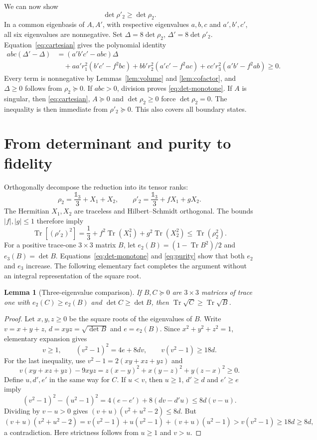 \documentclass[11pt,a4paper]{article}
\DeclareMathOperator{\Tr}{Tr}
\newcommand{\id}{\mathds{1}}
\newtheorem{lemma}{Lemma}
\begin{document}
We can now show
\begin{equation}\label{eq:det-monotone}
 \det\rho'_2\ge\det\rho_2.
\end{equation}
In a common eigenbasis of $A,A'$, with respective eigenvalues $a,b,c$
and $a',b',c'$, all six eigenvalues are nonnegative. Set
$\Delta=8\det\rho_2$, $\Delta'=8\det\rho'_2$.
Equation~\eqref{eq:cartesian} gives the polynomial identity
\begin{align*}
 abc(\Delta'-\Delta)
 &=(a'b'c'-abc)\Delta\\
 &\quad+aa'r_1^2(b'c'-f^2bc)
       +bb'r_2^2(a'c'-f^2ac)
       +cc'r_3^2(a'b'-f^2ab)\ge0.
\end{align*}
Every term is nonnegative by Lemmas~\ref{lem:volume} and
\ref{lem:cofactor}, and $\Delta\ge0$ follows from $\rho_2\succeq0$.
If $abc>0$, division proves \eqref{eq:det-monotone}.
If $A$ is singular, then
\eqref{eq:cartesian}, $A\succeq0$ and $\det\rho_2\ge0$ force
$\det\rho_2=0$. The inequality is then immediate from
$\rho'_2\succeq0$. This also covers all boundary states.

\section{From determinant and purity to fidelity}
Orthogonally decompose the reduction into its tensor ranks:
\[
 \rho_2=\frac{\id_3}{3}+X_1+X_2,\qquad
 \rho'_2=\frac{\id_3}{3}+fX_1+gX_2.
\]
The Hermitian $X_1,X_2$ are traceless and Hilbert--Schmidt orthogonal.
The bounds $|f|,|g|\le1$ therefore imply
\begin{equation}\label{eq:purity}
 \Tr[(\rho'_2)^2]=\frac13+f^2\Tr(X_1^2)+g^2\Tr(X_2^2)
 \le\Tr(\rho_2^2).
\end{equation}
For a positive trace-one $3\times3$ matrix $B$, let
$e_2(B)=(1-\Tr B^2)/2$ and $e_3(B)=\det B$.
Equations~\eqref{eq:det-monotone} and \eqref{eq:purity} show that
both $e_2$ and $e_3$ increase. The following elementary fact completes
the argument without an integral representation of the square root.

\begin{lemma}[Three-eigenvalue comparison]\label{lem:roots}
If $B,C\succeq0$ are $3\times3$ matrices of trace one with
$e_2(C)\ge e_2(B)$ and $\det C\ge\det B$, then
$\Tr\sqrt C\ge\Tr\sqrt B$.
\end{lemma}
\begin{proof}
Let $x,y,z\ge0$ be the square roots of the eigenvalues of $B$.
Write $v=x+y+z$, $d=xyz=\sqrt{\det B}$ and $e=e_2(B)$.
Since $x^2+y^2+z^2=1$, elementary expansion gives
\begin{equation}\label{eq:root-identities}
 v\ge1,\qquad (v^2-1)^2=4e+8dv,\qquad v(v^2-1)\ge18d.
\end{equation}
For the last inequality, use $v^2-1=2(xy+xz+yz)$ and
\[
 v(xy+xz+yz)-9xyz
 =z(x-y)^2+x(y-z)^2+y(z-x)^2\ge0.
\]
Define $u,d',e'$ in the same way for $C$. If $u<v$, then
$u\ge1$, $d'\ge d$ and $e'\ge e$ imply
\[
 (v^2-1)^2-(u^2-1)^2
 =4(e-e')+8(dv-d'u)\le8d(v-u).
\]
Dividing by $v-u>0$ gives
$(v+u)(v^2+u^2-2)\le8d$. But
\[
 (v+u)(v^2+u^2-2)
 =v(v^2-1)+u(v^2-1)+(v+u)(u^2-1)
 >v(v^2-1)\ge18d\ge8d,
\]
a contradiction. Here strictness follows from $u\ge1$ and $v>u$.
\end{proof}
\end{document}
